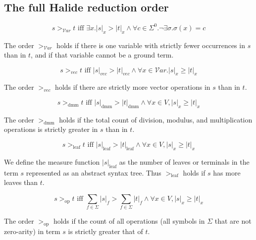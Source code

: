 \documentclass[acmsmall,review,anonymous]{acmart}\settopmatter{printfolios=true,printccs=false,printacmref=false}
\begin{document}
\subsection{The full Halide reduction order}
\label{a:reductionorder}

\begin{equation}
s >_{\mathcal{V}ar} t \textrm{ iff } \exists x . |s|_{x} > |t|_{x} \wedge \forall c \in \Sigma^0 . \lnot \exists \sigma . \sigma(x) = c
\end{equation}

The order $>_{\mathcal{V}ar}$ holds if there is one variable with strictly fewer occurrences in $s$ than in $t$, and if that variable cannot be a ground term. 

\begin{equation}
s >_{vec} t \textrm{ iff } |s|_{vec} > |t|_{vec} \wedge \forall x \in \mathcal{V}ar . |s|_x \geq |t|_x
\end{equation}

The order $>_{vec}$ holds if there are strictly more vector operations in $s$ than in $t$.

\begin{equation}
s >_{\textrm{dmm}} t \textrm{ iff } |s|_{\textrm{dmm}} > |t|_{\textrm{dmm}} \wedge \forall x \in V, |s|_x \geq |t|_x
\end{equation}

The order $>_{\textrm{dmm}}$ holds if the total count of division, modulus, and multiplication operations is strictly greater in $s$ than in $t$.

\begin{equation}
s >_{\textrm{leaf}} t \textrm{ iff } |s|_{\textrm{leaf}} > |t|_{\textrm{leaf}} \wedge \forall x \in V, |s|_x \geq |t|_x
\end{equation}

We define the measure function $|s|_{\textrm{leaf}}$ as the number of leaves or terminals in the term $s$ represented as an abstract syntax tree. Thus $>_{\textrm{leaf}}$ holds if $s$ has more leaves than $t$.

\begin{equation}
s >_{\textrm{op}} t \textrm{ iff } \sum_{f \in \Sigma} |s|_f > \sum_{f \in \Sigma} |t|_f \wedge \forall x \in V, |s|_x \geq |t|_x
\end{equation}

The order $>_{\textrm{op}}$ holds if the count of all operations (all symbols in $\Sigma$ that are not zero-arity) in term $s$ is strictly greater that of $t$.
\end{document}
